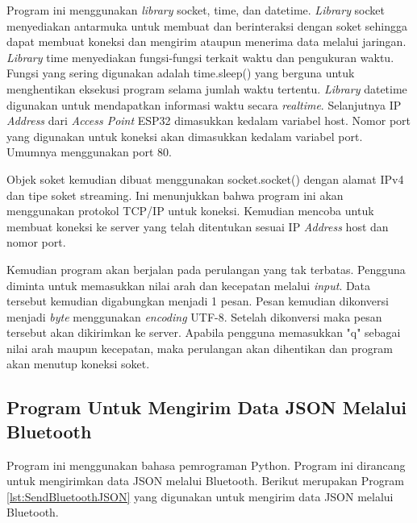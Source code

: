 Program ini menggunakan \emph{library} socket, time, dan datetime. \emph{Library} socket menyediakan antarmuka untuk membuat dan berinteraksi dengan soket sehingga dapat membuat koneksi dan mengirim ataupun menerima data melalui jaringan. \emph{Library} time menyediakan fungsi-fungsi terkait waktu dan pengukuran waktu. Fungsi yang sering digunakan adalah time.sleep() yang berguna untuk menghentikan eksekusi program selama jumlah waktu tertentu. \emph{Library} datetime digunakan untuk mendapatkan informasi waktu secara \emph{realtime}. Selanjutnya IP \emph{Address} dari \emph{Access Point} ESP32 dimasukkan kedalam variabel host. Nomor port yang digunakan untuk koneksi akan dimasukkan kedalam variabel port. Umumnya menggunakan port 80.

Objek soket kemudian dibuat menggunakan socket.socket() dengan alamat IPv4 dan tipe soket streaming. Ini menunjukkan bahwa program ini akan menggunakan protokol TCP/IP untuk koneksi. Kemudian mencoba untuk membuat koneksi ke server yang telah ditentukan sesuai IP \emph{Address} host dan nomor port.

Kemudian program akan berjalan pada perulangan yang tak terbatas. Pengguna diminta untuk memasukkan nilai arah dan kecepatan melalui \emph{input}. Data tersebut kemudian digabungkan menjadi 1 pesan. Pesan kemudian dikonversi menjadi \emph{byte} menggunakan \emph{encoding} UTF-8. Setelah dikonversi maka pesan tersebut akan dikirimkan ke server. Apabila pengguna memasukkan "q" sebagai nilai arah maupun kecepatan, maka perulangan akan dihentikan dan program akan menutup koneksi soket.

\subsection{Program Untuk Mengirim Data JSON Melalui Bluetooth}

Program ini menggunakan bahasa pemrograman Python. Program ini dirancang untuk mengirimkan data JSON melalui Bluetooth. Berikut merupakan Program \ref{lst:SendBluetoothJSON} yang digunakan untuk mengirim data JSON melalui Bluetooth.

